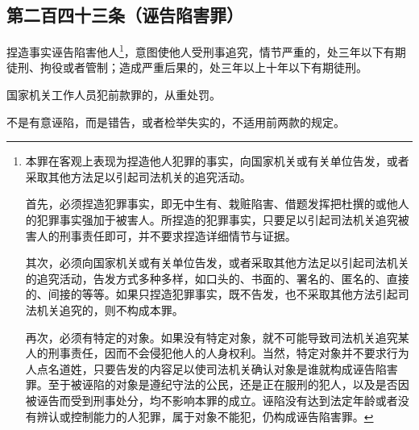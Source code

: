 \documentclass[utf-8,10pt]{ctexart}
\begin{document}
\subsection{第二百四十三条（诬告陷害罪）}
捏造事实诬告陷害他人\footnote{
本罪在客观上表现为捏造他人犯罪的事实，向国家机关或有关单位告发，或者采取其他方法足以引起司法机关的追究活动。

首先，必须捏造犯罪事实，即无中生有、栽赃陷害、借题发挥把杜撰的或他人的犯罪事实强加于被害人。所捏造的犯罪事实，只要足以引起司法机关追究被害人的刑事责任即可，并不要求捏造详细情节与证据。

其次，必须向国家机关或有关单位告发，或者采取其他方法足以引起司法机关的追究活动，告发方式多种多样，如口头的、书面的、署名的、匿名的、直接的、间接的等等。如果只捏造犯罪事实，既不告发，也不采取其他方法引起司法机关追究的，则不构成本罪。

再次，必须有特定的对象。如果没有特定对象，就不可能导致司法机关追究某人的刑事责任，因而不会侵犯他人的人身权利。当然，特定对象并不要求行为人点名道姓，只要告发的内容足以使司法机关确认对象是谁就构成诬告陷害罪。至于被诬陷的对象是遵纪守法的公民，还是正在服刑的犯人，以及是否因被诬告而受到刑事处分，均不影响本罪的成立。诬陷没有达到法定年龄或者没有辨认或控制能力的人犯罪，属于对象不能犯，仍构成诬告陷害罪。
}，意图使他人受刑事追究，情节严重的，处三年以下有期徒刑、拘役或者管制；造成严重后果的，处三年以上十年以下有期徒刑。

国家机关工作人员犯前款罪的，从重处罚。

不是有意诬陷，而是错告，或者检举失实的，不适用前两款的规定。
\end{document}

